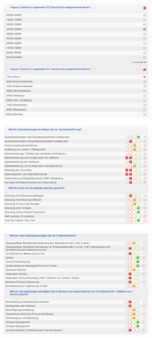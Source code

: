 \documentclass[12pt]{article}
\begin{document}
\begin{figure}[here!]
\centering
\includegraphics[width=0.7\textwidth]{images/tr53}
\end{figure}\FloatBarrier
\noindent
\begin{figure}[here!]
\centering
\includegraphics[width=0.7\textwidth]{images/tr54}
\end{figure}\FloatBarrier
\noindent
\begin{figure}[here!]
\centering
\includegraphics[width=0.7\textwidth]{images/tr55}
\end{figure}\FloatBarrier
\noindent
\end{document}
